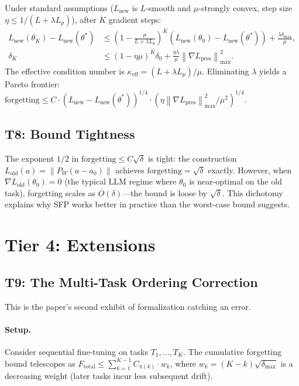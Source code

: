 \documentclass[11pt,a4paper]{article}
\theoremstyle{definition}
\newcommand{\proj}[1]{P_{#1}}
\newcommand{\norm}[1]{\left\|#1\right\|}
\begin{document}
Under standard assumptions ($L_{\mathrm{new}}$ is $L$-smooth and $\mu$-strongly convex, step size $\eta \leq 1/(L + \lambda L_p)$), after $K$ gradient steps:
\begin{align}
L_{\mathrm{new}}(\theta_K) - L_{\mathrm{new}}(\theta^*) &\leq \left(1 - \frac{\mu}{L + \lambda L_p}\right)^K\!\! (L_{\mathrm{new}}(\theta_0) - L_{\mathrm{new}}(\theta^*)) + \frac{\lambda \delta_{\max}}{\mu}, \label{eq:convergence} \\
\delta_K &\leq (1 - \eta\mu)^K \delta_0 + \frac{\eta\lambda}{\mu}\norm{\nabla L_{\mathrm{pres}}}_{\max}^2. \label{eq:drift}
\end{align}
The effective condition number is $\kappa_{\mathrm{eff}} = (L + \lambda L_p)/\mu$. Eliminating $\lambda$ yields a Pareto frontier: $\text{forgetting} \leq C \cdot (L_{\mathrm{new}} - L_{\mathrm{new}}(\theta^*))^{1/4} \cdot (\eta \norm{\nabla L_{\mathrm{pres}}}_{\max}^2 / \mu^2)^{1/4}$.

\subsection{T8: Bound Tightness}

The exponent $1/2$ in $\text{forgetting} \leq C\sqrt{\delta}$ is tight: the construction $L_{\mathrm{old}}(a) = \norm{\proj{W}(a - a_0)}$ achieves $\text{forgetting} = \sqrt{\delta}$ exactly. However, when $\nabla L_{\mathrm{old}}(\theta_0) = 0$ (the typical LLM regime where $\theta_0$ is near-optimal on the old task), forgetting scales as $O(\delta)$---the bound is loose by $\sqrt{\delta}$. This dichotomy explains why SFP works better in practice than the worst-case bound suggests.

\section{Tier 4: Extensions}
\label{sec:tier4}

\subsection{T9: The Multi-Task Ordering Correction}
\label{sec:t9}

This is the paper's second exhibit of formalization catching an error.

\paragraph{Setup.} Consider sequential fine-tuning on tasks $T_1, \ldots, T_K$. The cumulative forgetting bound telescopes as $F_{\mathrm{total}} \leq \sum_{k=1}^{K-1} C_{\pi(k)} \cdot w_k$, where $w_k = (K-k)\sqrt{\delta_{\max}}$ is a decreasing weight (later tasks incur less subsequent drift).
\end{document}
